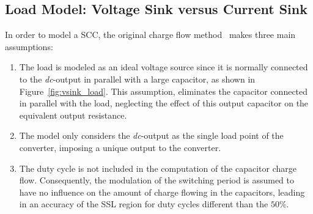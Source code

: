 \subsection{Load Model: Voltage Sink versus Current Sink}

In order to model a SCC, the original charge flow method~\cite{95Makowski} makes three main assumptions:
\begin{enumerate}
  \item The load is modeled as an ideal voltage source since it is normally connected to the \emph{dc}-output in parallel with a large capacitor, as shown in Figure~\ref{fig:vsink_load}. This assumption, eliminates the capacitor connected in parallel with the load, neglecting the effect of this output capacitor on the equivalent output resistance.

  \item The model only considers the \emph{dc}-output as the single load point of the converter, imposing a unique output to the converter.

  \item The duty cycle is not included in the computation of the capacitor charge flow. Consequently, the modulation of the switching period is assumed to have no influence on the amount of charge flowing in the capacitors, leading in an accuracy of the SSL region for duty cycles different than the $50\%$.
\end{enumerate}


